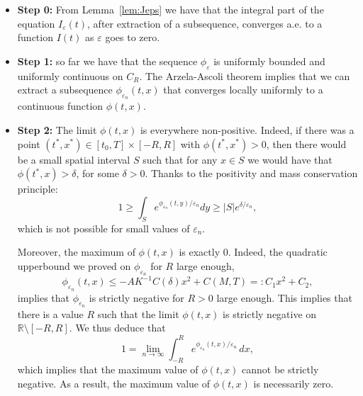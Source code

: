\documentclass[onefignum,onetabnum]{siamart190516}
\newcommand{\R}{\mathbb{R}}
\newcommand{\1}{\mathbbm{1}}
\newcommand{\eps}{\varepsilon}
\begin{document}
\begin{itemize} 
\item \textbf{Step 0:} From Lemma~\ref{lem:Jeps} we have that the integral part of the equation $I_\eps(t)$, after extraction of a subsequence, converges a.e. to a function $I(t)$ as $\eps$ goes to zero.

\item \textbf{Step 1:} so far we have that the sequence $\phi_\eps$ is uniformly bounded and uniformly continuous on $C_R$. The Arzela-Ascoli theorem implies that we can extract a subsequence $\phi_{\eps_n}(t,x)$ that converges locally uniformly to a continuous function $\phi(t,x)$.

\item \textbf{Step 2:}  The limit $\phi(t,x)$ is everywhere non-positive. Indeed, if there was a point $(t^*,x^*)\in[t_0,T]\times[-R,R]$ with $\phi(t^*,x^*)>0$, then there would be a small spatial interval $S$ such that for any $x\in S $ we would have that $\phi(t^*,x)>\delta$, for some $\delta>0$. Thanks to the positivity and mass conservation principle:
$$
1\geq \int_{S} e^{\phi_{\eps_n}(t,y)/\eps_n} dy\geq  |S| e^{\delta/\eps_n},
$$
which is not possible for small values of $\eps_n$. 

Moreover, the maximum of $\phi(t,x)$ is exactly $0$. Indeed, the quadratic upperbound we proved on $\phi_{\eps_n}$ for $R$ large enough,
$$
\phi_{\eps_n}(t,x)\leq -AK^{-1}C(\delta)x^2+C(M,T)=:C_1x^2+C_2,
$$
implies that $\phi_{\eps_n}$ is strictly negative for $R>0$ large enough. This implies that there is a value $R$ such that the limit $\phi(t,x)$ is strictly negative on $\R\setminus[-R,R]$. We thus deduce that
$$
1 = \lim_{n\rightarrow\infty}\int_{-R}^R e^{\phi_{\eps_n}(t,x)/\eps_n}\,dx,
$$
which implies that the maximum value of $\phi(t,x)$ cannot be strictly negative. As a result, the maximum value of $\phi(t,x)$ is necessarily zero.


\end{itemize}
\end{document}
